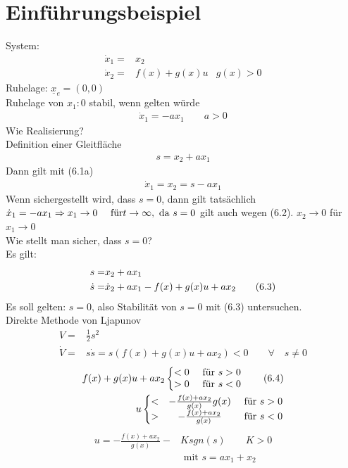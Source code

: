 \documentclass[ngerman]{tudscrreprt}
\begin{document}
\section{Einführungsbeispiel}
System: \begin{align}
\dot x_1 =& x_2\qquad & \tag{6.1a}\\
\dot x_2 =& f(x) + g(x)u &g(x)>0\tag{6.1b}
\end{align}
Ruhelage: $\underline x_e = (0,0)$\\
Ruhelage von $x_1: 0$ stabil, wenn gelten würde
\begin{align*}
\dot x_1 = -ax_1 \qquad a>0
\end{align*} 
Wie Realisierung?\\
Definition einer Gleitfläche
\begin{align}
s= x_2 + ax_1 \tag{6.2}
\end{align}
Dann gilt mit (6.1a) \begin{align*}\dot x_1 = x_2 = s-ax_1 \end{align*}
Wenn sichergestellt wird, dass $s=0$, dann gilt tatsächlich $\dot x_1 = -ax_1
\\ \Rightarrow x_1 \rightarrow 0 \quad \text{ für} t\to \infty, \text{ da } s=0 $ gilt auch wegen (6.2). $x_2 \to 0$ für $x_1\to 0$\\
Wie stellt man sicher, dass $s=0$?\\
Es gilt: \begin{align}
s= &x_2 + ax_1 \notag\\
\dot s =& \dot x_2 + ax_1-f(x) + g(x)u + ax_2 \tag{6.3}
\end{align}
Es soll gelten: $s=0$, also Stabilität von $s=0$ mit (6.3) untersuchen.\\
Direkte Methode von Ljapunov\\
\begin{align*}
V=&\frac{1}{2}s^2\\
\dot V=&s\dot s = s(f(x) + g(x)u + ax_2 )<0 \qquad \forall\quad  s\ne 0
\end{align*}
\begin{align}
f(x) + g(x)u + ax_2 \left\{ \begin{matrix} <0 & \text{ für } s>0\\ >0 &\text{ für } s<0 \end{matrix}\right.\tag{6.4}\\
u \left\{ \begin{matrix} <&-\frac{f(x) + ax_2}{g(x)}{g(x)}& \text{ für } s>0\\>&-\frac{f(x) + ax_2}{g(x)}& \text{ für } s<0 \end{matrix}\right.\notag
\end{align}
\begin{align*}u = -\frac{f(x) + ax_2}{g(x)} - &Ksgn(s) \qquad K>0\tag{6.4}\\ & \text{ mit } s=ax_1 + x_2\end{align*}
\end{document}
